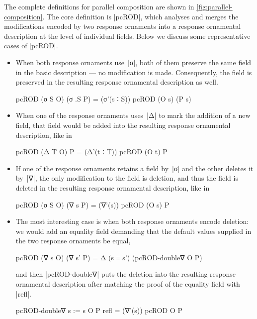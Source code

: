 The complete definitions for parallel composition are shown in \autoref{fig:parallel-composition}.
The core definition is |pcROD|, which analyses and merges the modifications encoded by two response ornaments into a response ornamental description at the level of individual fields.
Below we discuss some representative cases of |pcROD|.
\begin{itemize}
\item When both response ornaments use~|σ|, both of them preserve the same field in the basic description --- no modification is made.
Consequently, the field is preserved in the resulting response ornamental description as well.
\begin{code}
pcROD (σ S O) (σ .S P) = (σ'(s ∶ S)) pcROD (O s) (P s)
\end{code}
\item When one of the response ornaments uses~|Δ| to mark the addition of a new field, that field would be added into the resulting response ornamental description, like in
\begin{code}
pcROD (Δ T O) P = (Δ'(t ∶ T)) pcROD (O t) P
\end{code}
\item If one of the response ornaments retains a field by~|σ| and the other deletes it by~|∇|, the only modification to the field is deletion, and thus the field is deleted in the resulting response ornamental description, like in
\begin{code}
pcROD (σ S O) (∇ s P) = (∇'(s)) pcROD (O s) P
\end{code}
\item The most interesting case is when both response ornaments encode deletion: we would add an equality field demanding that the default values supplied in the two response ornaments be equal,
\begin{code}
pcROD (∇ s O) (∇ s' P) = Δ (s ≡ s') (pcROD-double∇ O P)
\end{code}
and then |pcROD-double∇| puts the deletion into the resulting response ornamental description after matching the proof of the equality field with |refl|.
\begin{code}
pcROD-double∇ {s := s} O P refl = (∇'(s)) pcROD O P
\end{code}

\end{itemize}
